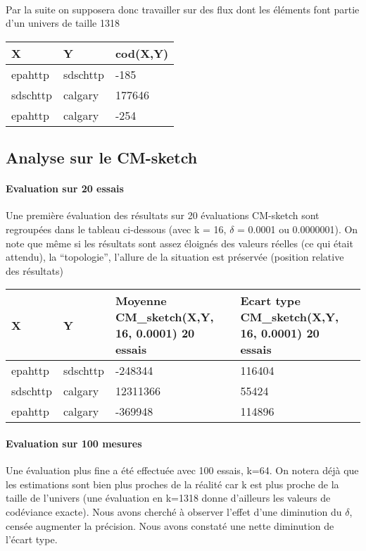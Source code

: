 \documentclass[a4paper,11pt]{article}%
\begin{document}
\paragraph{}Par la suite on supposera donc travailler sur des flux dont les éléments font partie d'un univers de taille 1318

\begin{tabularx}{\textwidth}{|l|l|X|}
      \hline X & Y & cod(X,Y) \\ \hline
      epahttp & sdschttp & -185 \\ \hline
      sdschttp & calgary & 177646 \\ \hline
      epahttp & calgary & -254  \\ \hline
\end{tabularx}

\subsection{Analyse sur le CM-sketch}

\paragraph{Evaluation sur 20 essais}Une première évaluation des résultats sur 20 évaluations CM-sketch sont regroupées dans le tableau ci-dessous 
(avec k = 16, $\delta$ = 0.0001 ou 0.0000001).\newline
On note que même si les résultats sont assez éloignés des valeurs réelles (ce qui était attendu), la ``topologie'',  l'allure de la situation est préservée (position relative des résultats)

\begin{tabularx}{\textwidth}{|l|l|X|X|}
      \hline X & Y & Moyenne CM\_sketch(X,Y, 16, 0.0001) 20 essais & Ecart type CM\_sketch(X,Y, 16, 0.0001) 20 essais \\ \hline
      epahttp & sdschttp & -248344 & 116404 \\ \hline
      sdschttp & calgary & 12311366 & 55424 \\ \hline
      epahttp & calgary & -369948  & 114896 \\ \hline
\end{tabularx}

\paragraph{Evaluation sur 100 mesures}Une évaluation plus fine a été effectuée avec 100 essais, k=64. On notera déjà que les estimations sont bien plus 
proches de la réalité car k est plus proche de la taille de l'univers
(une évaluation en k=1318 donne d'ailleurs les valeurs de codéviance exacte). Nous avons cherché à observer l'effet d'une diminution du $\delta$, 
censée augmenter la précision. Nous avons constaté une nette diminution de l'écart type.
\end{document}
